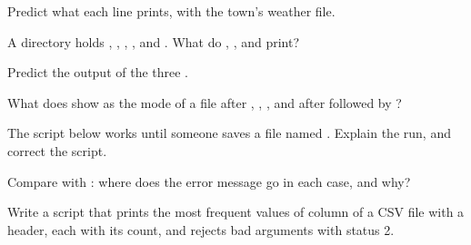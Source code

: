 \begin{exercise}[$\star$]\label{exo:b1:the-shell:1}
Predict what each line prints, with  the town's weather file.
\end{exercise}

\begin{exercise}[$\star$]\label{exo:b1:the-shell:2}
A directory holds , , , ,  and . What do
, ,  and  print?
\end{exercise}

\begin{exercise}[$\star$]\label{exo:b1:the-shell:3}
Predict the output of the three .
\end{exercise}

\begin{exercise}[$\star$]\label{exo:b1:the-shell:4}
What does  show as the mode of a file after , , , and after
 followed by ?
\end{exercise}

\begin{exercise}[$\star\star$]\label{exo:b1:the-shell:5}
The script below works until someone saves a file named . Explain the run, and correct the
script.
\end{exercise}

\begin{exercise}[$\star\star$]\label{exo:b1:the-shell:6}
Compare  with : where does the error message
go in each case, and why?
\end{exercise}

\begin{exercise}[$\star\star$]\label{exo:b1:the-shell:7}
Write a script  that prints the  most frequent values of column  of a CSV file
with a header, each with its count, and rejects bad arguments with status 2.
\end{exercise}


